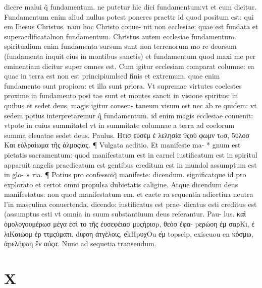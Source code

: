 \documentclass{article}
\begin{document}
\begin{pages}
dicere malui q̃ fundamentum. ne putetur hic dici fundamentum:vt et cum dicitur. Fundamentum enim aliud nullus potest poneres praettr id quod positum est: qui em Ihesus Christus. nam hoc Christo conue- nit non ecclesiae: quae est fundata et superaedificatalnon fundamentum. Christus autem ecclesiae fundamentum. spiritualium enim fundamenta sursum sunt non terrenorum mo re deorsum (fundamenta inquit eius in montibus sanctis) et fundamentum quod maxi me per eminentiam dicitur super omnes est. Cum igitur ecclesiam comparat columne: ea quae in terra est non est principiumlsed finis et extremum. quae enim fundamento sunt propiora: et illa sunt priora. Vt supremae virtutes coelestes proxime in fundamento posi tae sunt et montes sancti in visione spiritus: in quibus et sedet deus, magis igitur consen- taneum visum est nec ab re quidem: vt sedem potius interpretaremur q̃ fundamentum. id enim magis ecclesiae conuenit: vtpote in cuius summitatel vt in summitate columnae a terra ad coelorum summa eleuatae sedet deus. Paulus. Hτισ εὐσὲμ ἐ λελησία 9ςοὺ φωμν  τoσ, 5ὐλοσ Και εὐλραίωμα τῆς ἀλμοςίας. ¶ Vulgata aeditio. Et manifeste ma- * gnum est pietatis sacramentum: quod manifestatum est in carnel iustificatum est in spiritul  apparuit angelis praedicatum est gentibus creditum est in mundol assumptum est in glo- » ria. ¶ Potius pro confessoiq̃ manifeste: dicendum. significatque id pro explorato et certot omni propulsa dubietatis caligine. Atque dicendum deus manifestatus: non quod manifestatum em. et caete ra sequentia adiectiua neutra l’in masculina conuertenda. dicendo: iustificatus est prae- dicatus esti creditus est (assumptus esti vt omnia in suum substantiuum deus referantur. Pau- lus. καὶ ὁμολογουμέρωσ μέγα ἐσὶ το τῆς ἐυσεφέιασ μυςήριοp, θεὸσ ἐφα- pερώοη ἐμ σαρΚι, ἐ λιΚαιώομ ἐρ ττμςύματι. dιφοη ἀτγέλοις, e̓kHpυχOu e̓μ topscip, exiseuou en κόσμω, ἀpελήφoη ἔν αόςα. Nunc ad sequetia transeüdum.  \pend
\section*{X }

\end{pages}
\end{document}

